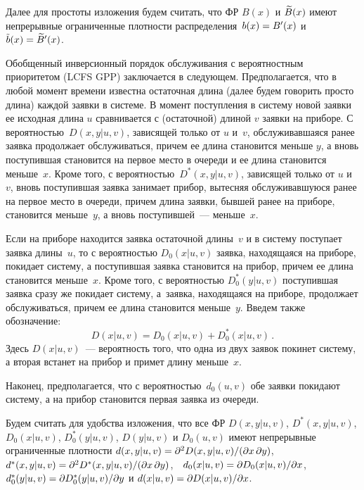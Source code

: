 \begin{multicols}{2}
Далее для простоты изложения будем считать,
что ФР $B(x)$ и $\widetilde B(x)$ имеют непрерывные
ограниченные плотности
распределения~$b(x)\hm=B'(x)$ и $\tb(x)\hm=\tB'(x)$.

Обобщенный инверсионный порядок обслуживания
с вероятностным приоритетом ({LCFS GPP})
заключается в следующем.
Предполагается, что в любой момент времени
известна остаточная длина (далее будем говорить
просто длина) каждой заявки в системе.
В момент поступления в систему новой заявки ее
исходная длина $u$ сравнивается с (остаточной)
длиной $v$ заявки на приборе.
С вероятностью~$D(x,y|u,v)$,
зависящей только от $u$ и~$v$, обслуживавшаяся
ранее заявка продолжает обслуживаться, причем
ее длина становится меньше $y$, а вновь
поступившая становится на первое место в очереди
и ее длина становится меньше~$x$.
Кроме того, с вероятностью~$D^*(x,y|u,v)$,
зависящей только от $u$ и~$v$, вновь поступившая
заявка занимает прибор, вытесняя обслуживавшуюся
ранее на первое место в очереди, причем длина
заявки, бывшей ранее на приборе, становится
меньше~$y$, а вновь поступившей~--- меньше~$x$.

Если на приборе находится заявка остаточной
длины~$v$ и в систему поступает заявка
длины~$u$, то с вероятностью $D_0(x|u,v)$
заявка, находящаяся на приборе, покидает
систему, а поступившая заявка становится на
прибор, причем ее длина становится меньше~$x$.
Кроме того, с вероятностью
$D_0^*(y|u,v)$ поступившая заявка сразу же
покидает систему, а~заявка, находящаяся на
приборе, продолжает обслуживаться, причем ее
длина становится меньше~$y$.
Введем также обозначение:
\begin{equation*}
D(x|u,v) = D_0(x|u,v) + D_0^*(x|u,v)\,.
\end{equation*}
Здесь $D(x|u,v)$~--- вероятность того, что одна
из двух заявок покинет систему, а вторая встанет
на прибор и примет длину меньше~$x$.

Наконец, предполагается, что с
вероят\-ностью~$d_0(u,v)$ обе заявки покидают
систему, а на прибор становится первая заявка
из очереди.

Будем считать для удобства изложения, что все
ФР $D(x,y|u,v)$, $D^*(x,y|u,v)$, $D_0(x|u,v)$,
$D_0^*(y|u,v)$, $D(y|u,v)$ и $D_0(u,v)$
имеют непрерывные ограниченные плотности
$d(x,y|u,v)\hm=\partial^2 D(x,y|u,v)/
(\partial x\, \partial y)$,\ \
$d^*(x,y|u,v)\hm=\partial^2 D^*(x,y|u,v)/
(\partial x\, \partial y)$,\ \
$d_0(x|u,v)\hm= \partial D_0(x|u,v)/\partial x$,\ \
$d_0^*(y|u,v)\hm=\partial D_0^*(y|u,v)/\partial y$
и
$d(x|u,v)\hm=\partial D(x|u,v)/\partial x$.



\end{multicols}
